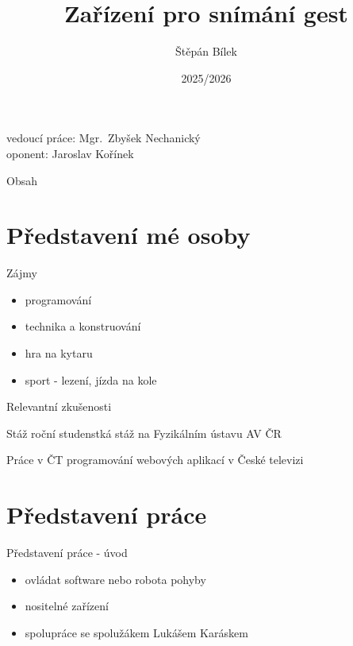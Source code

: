 \documentclass[14pt]{beamer}
\title{Zařízení pro snímání gest}
\author{Štěpán Bílek}
\date{2025/2026}
\begin{document}
\begin{frame}
  \titlepage

  \vspace{0.5cm}

  {\footnotesize
    vedoucí práce: Mgr.~Zbyšek Nechanický\\
    oponent: Jaroslav Kořínek\\
  }
\end{frame}

\begin{frame}{Obsah}
  \tableofcontents
\end{frame}

\section{Představení mé osoby}
\begin{frame}{Zájmy}
	\begin{itemize}
    \item programování
    \item technika a konstruování
    \item hra na kytaru
    \item sport - lezení, jízda na kole
  \end{itemize}
\end{frame}

\begin{frame}{Relevantní zkušenosti}
	\begin{block}{Stáž}
    roční studenstká stáž na Fyzikálním ústavu AV ČR
  \end{block}
  \begin{block}{Práce v ČT}
    programování webových aplikací v České televizi
  \end{block}
\end{frame}

\section{Představení práce}
\begin{frame}{Představení práce - úvod}
  \begin{itemize}
    \item ovládat software nebo robota pohyby
    \item nositelné zařízení
    \item spolupráce se spolužákem Lukášem Karáskem
  \end{itemize}
\end{frame}
\end{document}
